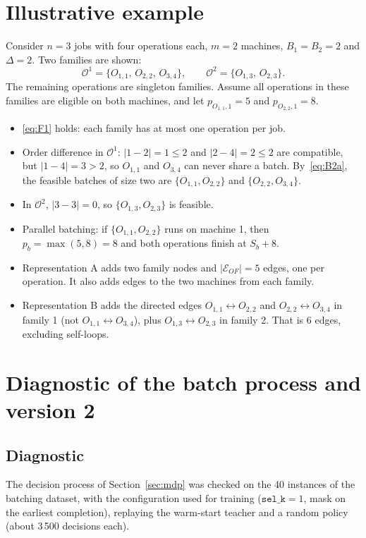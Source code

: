 \documentclass[11pt,a4paper]{article}
\newcommand{\Oset}{\mathcal{O}}
\newcommand{\Eset}{\mathcal{E}}
\begin{document}
\section{Illustrative example}
\label{sec:example}

Consider $n=3$ jobs with four operations each, $m=2$ machines, $B_1=B_2=2$ and
$\Delta=2$. Two families are shown:
\[
  \Oset^1=\{O_{1,1},\,O_{2,2},\,O_{3,4}\},\qquad
  \Oset^2=\{O_{1,3},\,O_{2,3}\}.
\]
The remaining operations are singleton families. Assume all operations in these
families are eligible on both machines, and let $p_{O_{1,1},1}=5$ and $p_{O_{2,2},1}=8$.
\begin{itemize}
  \item \eqref{eq:F1} holds: each family has at most one operation per job.
  \item Order difference in $\Oset^1$: $|1-2|=1\le2$ and $|2-4|=2\le2$ are compatible, but $|1-4|=3>2$, so $O_{1,1}$ and $O_{3,4}$ can never share a batch. By~\eqref{eq:B2a}, the feasible batches of size two are $\{O_{1,1},O_{2,2}\}$ and $\{O_{2,2},O_{3,4}\}$.
  \item In $\Oset^2$, $|3-3|=0$, so $\{O_{1,3},O_{2,3}\}$ is feasible.
  \item Parallel batching: if $\{O_{1,1},O_{2,2}\}$ runs on machine 1, then $p_b=\max(5,8)=8$ and both operations finish at $S_b+8$.
  \item Representation A adds two family nodes and $|\Eset_{OF}|=5$ edges, one per operation. It also adds edges to the two machines from each family.
  \item Representation B adds the directed edges $O_{1,1}\leftrightarrow O_{2,2}$ and $O_{2,2}\leftrightarrow O_{3,4}$ in family 1 (not $O_{1,1}\leftrightarrow O_{3,4}$), plus $O_{1,3}\leftrightarrow O_{2,3}$ in family 2. That is 6 edges, excluding self-loops.
\end{itemize}

\section{Diagnostic of the batch process and version 2}
\label{sec:diagnostic}

\subsection{Diagnostic}
The decision process of Section~\ref{sec:mdp} was checked on the 40 instances of the
batching dataset, with the configuration used for training ($\texttt{sel\_k}=1$,
mask on the earliest completion), replaying the warm-start teacher and a random policy
(about 3\,500 decisions each).
\end{document}
